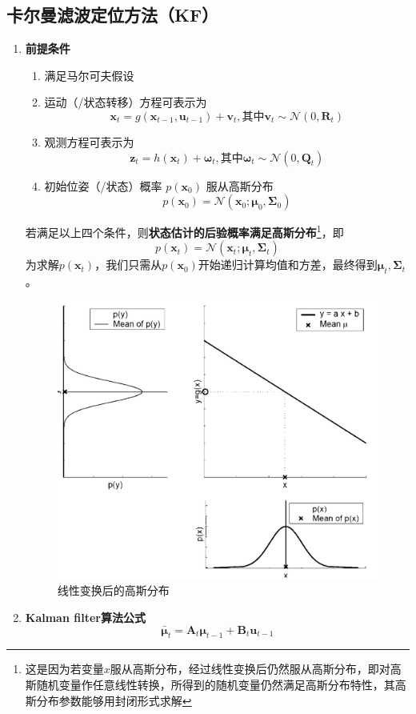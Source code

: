 \documentclass[../main.tex]{subfiles}
\begin{document}
\subsection{卡尔曼滤波定位方法（KF）}
\begin{enumerate}
    \item \textbf{前提条件}
        \begin{enumerate}
            \item 满足马尔可夫假设
            \item 运动（/状态转移）方程可表示为
$$\mathbf{x}_{t} = g(\mathbf{x}_{t-1}, \mathbf{u}_{t-1}) + \mathbf{v}_{t} ,\text{其中} \mathbf{v}_{t} \sim \mathcal{N}(0, \mathbf{R}_{t})$$
            \item 观测方程可表示为
$$
\mathbf{z}_{t} = h(\mathbf{x}_{t}) + \mathbf{\omega}_{t},\text{其中}\mathbf{\omega}_{t} \sim \mathcal{N}(0, \mathbf{Q}_{t})$$
            \item 初始位姿（/状态）概率 $p(\mathbf{x}_{0})$ 服从高斯分布
$$p(\mathbf{x}_{0}) = \mathcal{N}(\mathbf{x}_{0}; \boldsymbol{\mu}_{0}, 
\boldsymbol{\Sigma}_{0})$$
        \end{enumerate}
        若满足以上四个条件，则\textbf{状态估计的后验概率满足高斯分布}\footnote{这是因为若变量$x$服从高斯分布，经过线性变换后仍然服从高斯分布，即对高斯随机变量作任意线性转换，所得到的随机变量仍然满足高斯分布特性，其高斯分布参数能够用封闭形式求解}，即$$p(\mathbf{x}_{t}) = \mathcal{N}(\mathbf{x}_{t}; \boldsymbol{\mu}_{t}, \boldsymbol{\Sigma}_{t})$$
        为求解$p(\mathbf{x}_{t})$，我们只需从$p(\mathbf{x}_{0})$开始递归计算均值和方差，最终得到$\boldsymbol{\mu}_{t}, \boldsymbol{\Sigma}_{t}$。
        \begin{figure}[H]
            \centering
            \includegraphics[width=0.4\linewidth]{images/linear.png}
            \caption{线性变换后的高斯分布}
        \end{figure}
        \item \textbf{Kalman filter算法公式}
          $$
          \bar{\boldsymbol{\mu}}_t = \mathbf{A}_t\boldsymbol{\mu}_{t-1} + \mathbf{B}_t\mathbf{u}_{t-1}
$$
\end{enumerate}
\end{document}
